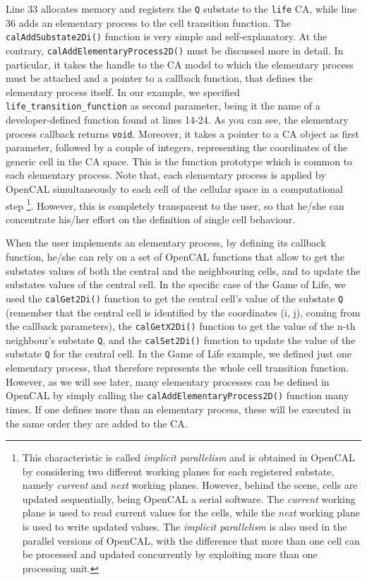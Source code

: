 Line 33 allocates memory and registers the \verb'Q' substate to the
\verb'life' CA, while line 36 adds an elementary process to the cell
transition function. The \verb'calAddSubstate2Di()' function is very
simple and self-explanatory. At the contrary,
\verb'calAddElementaryProcess2D()' must be discussed more in
detail. In particular, it takes the handle to the CA model to which
the elementary process must be attached and a pointer to a callback
function, that defines the elementary process itself. In our example,
we specified \verb'life_transition_function' as second parameter,
being it the name of a developer-defined function found at lines
14-24. As you can see, the elementary process callback returns
\verb'void'. Moreover, it takes a pointer to a CA object as first
parameter, followed by a couple of integers, representing the
coordinates of the generic cell in the CA space. This is the function
prototype which is common to each elementary process. Note that, each
elementary process is applied by OpenCAL simultaneously to each cell
of the cellular space in a computational step \footnote{This
  characteristic is called \emph{implicit parallelism} and is obtained
  in OpenCAL by considering two different working planes for each
  registered substate, namely \emph{current} and \emph{next} working
  planes. However, behind the scene, cells are updated sequentially,
  being OpenCAL a serial software. The \emph{current} working plane is
  used to read current values for the cells, while the \emph{next}
  working plane is used to write updated values. The \emph{implicit
    parallelism} is also used in the parallel versions of OpenCAL,
  with the difference that more than one cell can be processed and
  updated concurrently by exploiting more than one processing
  unit.}. However, this is completely transparent to the user, so that
he/she can concentrate his/her effort on the definition of single cell
behaviour.

When the user implements an elementary process, by defining its
callback function, he/she can rely on a set of OpenCAL functions that
allow to get the substates values of both the central and the
neighbouring cells, and to update the substates values of the central
cell. In the specific case of the Game of Life, we used the
\verb'calGet2Di()' function to get the central cell's value of the
substate \verb'Q' (remember that the central cell is identified by the
coordinates (i, j), coming from the callback parameters), the
\verb'calGetX2Di()' function to get the value of the n-th neighbour's
substate \verb'Q', and the \verb'calSet2Di()' function to update the
value of the substate \verb'Q' for the central cell. In the Game of
Life example, we defined just one elementary process, that therefore
represents the whole cell transition function. However, as we will see
later, many elementary processes can be defined in OpenCAL by simply
calling the \verb'calAddElementaryProcess2D()' function many times. If
one defines more than an elementary process, these will be executed in
the same order they are added to the CA.

